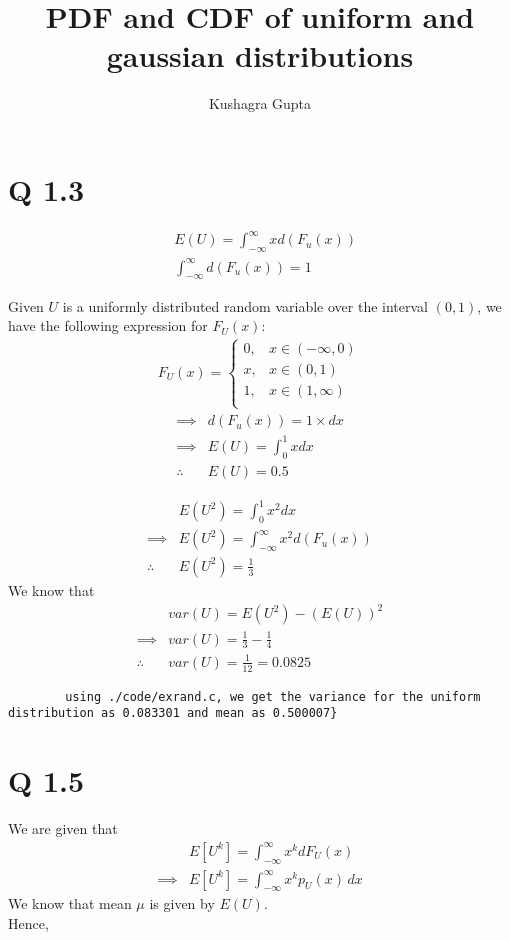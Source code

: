 \documentclass[journal,12pt,twocolumn]{IEEEtran}
\title{PDF and CDF of uniform and gaussian distributions}
\author{Kushagra Gupta}
\date{}
\begin{document}
\maketitle

\section{Q 1.3}
\begin{align}
    &E(U) = \int _ {- \infty} ^ {\infty} {x d(F_u(x))} \\
    &\int _ {- \infty} ^ {\infty} { d(F_u(x))} = 1
\end{align}

\noindent Given $U$ is a uniformly distributed random variable over the interval $(0, 1)$, we have the following expression for $F_U(x)$:
\begin{align}
    F_U(x) =
	    \begin{cases}
	    	0, & x \in (-\infty, 0) \\
  	    	x, & x \in (0, 1) \\
    		1, & x \in (1, \infty)\\
    	    \end{cases}
\end{align}
\begin{align}
    \implies &d(F_u(x)) = 1 \times dx\\
    \implies &E(U) = \int _ {0} ^ {1} {x dx}\\
    \therefore &E(U) = 0.5
\end{align}

\begin{align}
        &E(U^2) = \int _ {0} ^ {1} {x^2 dx} \\
    \implies &E(U^2) = \int _ {- \infty} ^ {\infty} {x^2 d(F_u(x))} \\
        \therefore &E(U^2) = \frac{1}{3}
\end{align}
We know that
\begin{align}
    &var(U) = E(U^2) - (E(U))^2 \\
   \implies&var(U) = \frac{1}{3} - \frac{1}{4} \\
    \therefore &var(U) = \frac{1}{12} = 0.0825
\end{align}

    \begin{lstlisting}
        using ./code/exrand.c, we get the variance for the uniform distribution as 0.083301 and mean as 0.500007}
    \end{lstlisting}
\section {Q 1.5}
We are given that
\begin{align}
            &E[U^k] = \int^{\infty}_{-\infty} x^k dF_U(x)\\
    \implies&E[U^k] = \int^{\infty}_{-\infty} x^k p_U(x) \,dx		\label{eq: Expected}
\end{align}
We know that mean $\mu$ is given by $E(U)$.\\ Hence,
\end{document}
